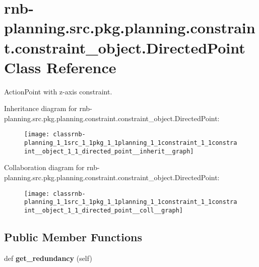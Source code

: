 \hypertarget{classrnb-planning_1_1src_1_1pkg_1_1planning_1_1constraint_1_1constraint__object_1_1_directed_point}{}\section{rnb-\/planning.src.\+pkg.\+planning.\+constraint.\+constraint\+\_\+object.\+Directed\+Point Class Reference}
\label{classrnb-planning_1_1src_1_1pkg_1_1planning_1_1constraint_1_1constraint__object_1_1_directed_point}


Action\+Point with z-\/axis constraint.  




Inheritance diagram for rnb-\/planning.src.\+pkg.\+planning.\+constraint.\+constraint\+\_\+object.\+Directed\+Point\+:
\nopagebreak
\begin{figure}[H]
\begin{center}
\leavevmode
\texttt{[image: classrnb-planning\_1\_1src\_1\_1pkg\_1\_1planning\_1\_1constraint\_1\_1constraint\_\_object\_1\_1\_directed\_point\_\_inherit\_\_graph]}
\end{center}
\end{figure}


Collaboration diagram for rnb-\/planning.src.\+pkg.\+planning.\+constraint.\+constraint\+\_\+object.\+Directed\+Point\+:
\nopagebreak
\begin{figure}[H]
\begin{center}
\leavevmode
\texttt{[image: classrnb-planning\_1\_1src\_1\_1pkg\_1\_1planning\_1\_1constraint\_1\_1constraint\_\_object\_1\_1\_directed\_point\_\_coll\_\_graph]}
\end{center}
\end{figure}
\subsection*{Public Member Functions}
\begin{DoxyCompactItemize}
\item 
\mbox{\label{classrnb-planning_1_1src_1_1pkg_1_1planning_1_1constraint_1_1constraint__object_1_1_directed_point_abe2591231bd5936820be604861db4aac}} 
def {\bfseries get\+\_\+redundancy} (self)
\end{DoxyCompactItemize}

